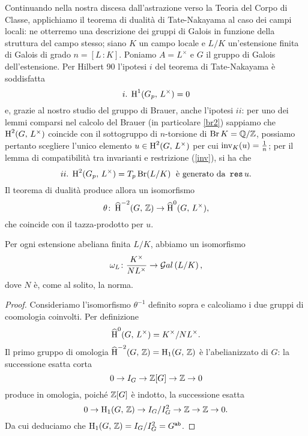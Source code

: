 Continuando nella nostra discesa dall'astrazione verso la Teoria del Corpo di Classe, applichiamo il teorema di dualità di Tate-Nakayama al caso dei campi locali: ne otterremo una descrizione dei gruppi di Galois in funzione della struttura del campo stesso; siano $ K $ un campo locale e $ L / K  $ un'estensione finita di Galois di grado $ n = [L\,\colon K] $. Poniamo $ A = L^\times $ e $ G $ il gruppo di Galois dell'estensione. Per Hilbert 90 l'ipotesi $ i $ del teorema di Tate-Nakayama è soddisfatta 
\[ i. \; \operatorname{H}^1(G_p,\, L^\times) = 0 \]
e, grazie al nostro studio del gruppo di Brauer, anche l'ipotesi $ ii $: per uno dei lemmi comparsi nel calcolo del Brauer (in particolare \ref{br2}) sappiamo che $ \operatorname{H}^2(G, \, L^\times) $ coincide con il sottogruppo di $ n $-torsione di $ \operatorname{Br} K = \mathbb{Q}/\mathbb{Z} $, possiamo pertanto scegliere l'unico elemento $ u \in \operatorname{H}^2(G, \, L^\times) $ per cui $ \operatorname{inv}_K(u) = \frac{1}{n} $; per il lemma di compatibilità tra invarianti e restrizione (\ref{inv}), si ha che
\[ ii. \; \operatorname{H}^2(G_p, \, L^\times) = T_p \operatorname{Br}(L/K) \;\text{ è generato da } \operatorname{\mathtt{res}} u. \]
Il teorema di dualità produce allora un isomorfismo
\[ \theta\colon \operatorname{\widehat{H}}^{-2}(G, \, \mathbb{Z}) \to \operatorname{\widehat{H}}^{0}(G, \,  L^\times), \]
che coincide con il tazza-prodotto per $ u. $

\begin{theorem}
	Per ogni estensione abeliana finita $ L/K $, abbiamo un isomorfismo
	\[ \omega_L\colon \frac{K^\times}{NL^\times} \to \mathcal{G}al\left( L/K \right), \]
	dove $ N $ è, come al solito, la norma.
\end{theorem}

\begin{proof}
	Consideriamo l'isomorfismo $ \theta^{-1} $ definito sopra e calcoliamo i due gruppi di coomologia coinvolti. Per definizione
	\[ \operatorname{\widehat{H}}^{0}(G, \,  L^\times) = K^\times / NL^\times. \]
	Il primo gruppo di omologia $ \operatorname{\widehat{H}}^{-2}(G, \, \mathbb{Z}) = \operatorname{H}_1(G, \, \mathbb{Z}) $ è l'abelianizzato di $ G $: la successione esatta corta
	\[ 0 \to I_G \to \mathbb{Z}[G] \to \mathbb{Z} \to 0 \]
	produce in omologia, poiché $ \mathbb{Z}[G] $ è indotto, la successione esatta
	\[ 0 \to \operatorname{H}_1(G,\, \mathbb{Z}) \to I_G/I_G^2 \to \mathbb{Z} \to \mathbb{Z} \to 0. \]
	Da cui deduciamo che $ \operatorname{H}_1(G,\, \mathbb{Z}) = I_G/I_G^2 = G^\mathtt{ab} $.
\end{proof}



